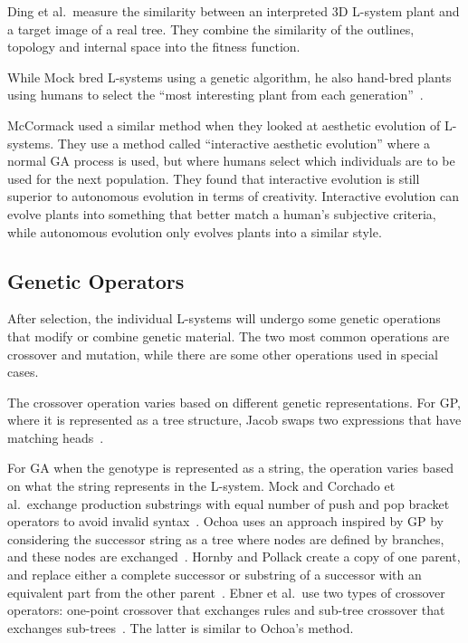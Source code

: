 Ding et al.\ measure the similarity between an interpreted 3D \gls{L-system} plant and a target image of a real tree.
They combine the similarity of the outlines, topology and internal space into the fitness function.~\cite{2013Ding}

While Mock bred \glspl{L-system} using a genetic algorithm, he also hand-bred plants using humans to select the ``most interesting plant from each generation''~\cite{1998Mock}.

McCormack used a similar method when they looked at aesthetic evolution of \glspl{L-system}.
They use a method called ``interactive aesthetic evolution'' where a normal \gls{GA} process is used, but where humans select which individuals are to be used for the next population.
They found that interactive evolution is still superior to autonomous evolution in terms of creativity.
Interactive evolution can evolve plants into something that better match a human's subjective criteria, while autonomous evolution only evolves plants into a similar style.~\cite{2004McCormack}

\subsection{Genetic Operators}
After selection, the individual \glspl{L-system} will undergo some genetic operations that modify or combine genetic material.
The two most common operations are crossover and mutation, while there are some other operations used in special cases.

The crossover operation varies based on different genetic representations.
For \gls{GP}, where it is represented as a tree structure, Jacob swaps two expressions that have matching heads~\cite{1994Jacob,1995Jacob}.

For \gls{GA} when the genotype is represented as a string, the operation varies based on what the string represents in the \gls{L-system}.
Mock and Corchado et al.\ exchange production substrings with equal number of push and pop bracket operators to avoid invalid syntax~\cite{1998Mock,2009Corchado}.
Ochoa uses an approach inspired by \gls{GP} by considering the successor string as a tree where nodes are defined by branches, and these nodes are exchanged~\cite{1998Ochoa}.
Hornby and Pollack create a copy of one parent, and replace either a complete successor or substring of a successor with an equivalent part from the other parent~\cite{2001Hornby}.
Ebner et al.\ use two types of crossover operators: one-point crossover that exchanges rules and sub-tree crossover that exchanges sub-trees~\cite{2002Ebner,2003Ebner}.
The latter is similar to Ochoa's method.


